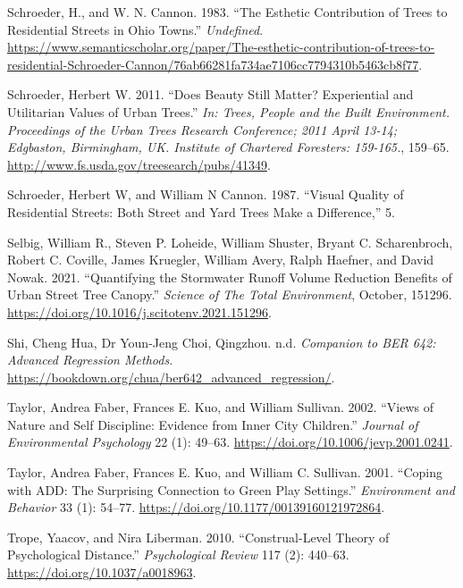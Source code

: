 \documentclass[12pt,twoside]{reedthesis}
\newlength{\cslhangindent}
\newenvironment{CSLReferences}[2] %
 {%
  \setlength{\parindent}{0pt}
  \ifodd #1 \everypar{\setlength{\hangindent}{\cslhangindent}}\ignorespaces\fi
  \ifnum #2 > 0
  \setlength{\parskip}{#2\baselineskip}
  \fi
 }%
 {}
\begin{document}
\begin{CSLReferences}{1}{0}
\leavevmode{}%
Schroeder, H., and W. N. Cannon. 1983. {``The Esthetic Contribution of Trees to Residential Streets in Ohio Towns.''} \emph{Undefined}. \url{https://www.semanticscholar.org/paper/The-esthetic-contribution-of-trees-to-residential-Schroeder-Cannon/76ab66281fa734ae7106cc7794310b5463cb8f77}.

\leavevmode{}%
Schroeder, Herbert W. 2011. {``Does Beauty Still Matter? Experiential and Utilitarian Values of Urban Trees.''} \emph{In: Trees, People and the Built Environment. Proceedings of the Urban Trees Research Conference; 2011 April 13-14; Edgbaston, Birmingham, UK. Institute of Chartered Foresters: 159-165.}, 159--65. \url{http://www.fs.usda.gov/treesearch/pubs/41349}.

\leavevmode{}%
Schroeder, Herbert W, and William N Cannon. 1987. {``Visual Quality of Residential Streets: Both Street and Yard Trees Make a Difference,''} 5.

\leavevmode{}%
Selbig, William R., Steven P. Loheide, William Shuster, Bryant C. Scharenbroch, Robert C. Coville, James Kruegler, William Avery, Ralph Haefner, and David Nowak. 2021. {``Quantifying the Stormwater Runoff Volume Reduction Benefits of Urban Street Tree Canopy.''} \emph{Science of The Total Environment}, October, 151296. \url{https://doi.org/10.1016/j.scitotenv.2021.151296}.

\leavevmode{}%
Shi, Cheng Hua, Dr Youn-Jeng Choi, Qingzhou. n.d. \emph{Companion to BER 642: Advanced Regression Methods}. \url{https://bookdown.org/chua/ber642_advanced_regression/}.

\leavevmode{}%
Taylor, Andrea Faber, Frances E. Kuo, and William Sullivan. 2002. {``Views of Nature and Self Discipline: Evidence from Inner City Children.''} \emph{Journal of Environmental Psychology} 22 (1): 49--63. \url{https://doi.org/10.1006/jevp.2001.0241}.

\leavevmode{}%
Taylor, Andrea Faber, Frances E. Kuo, and William C. Sullivan. 2001. {``Coping with ADD: The Surprising Connection to Green Play Settings.''} \emph{Environment and Behavior} 33 (1): 54--77. \url{https://doi.org/10.1177/00139160121972864}.

\leavevmode{}%
Trope, Yaacov, and Nira Liberman. 2010. {``Construal-Level Theory of Psychological Distance.''} \emph{Psychological Review} 117 (2): 440--63. \url{https://doi.org/10.1037/a0018963}.


\end{CSLReferences}
\end{document}
